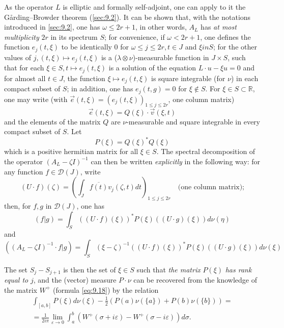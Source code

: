 \documentclass[12pt,a4paper,leqno,twoside]{extbook}
\newcommand{\R}{\mathbb{R}}
\begin{document}
As the operator \(L\) is elliptic and formally self-adjoint, one can apply to it the Gårding--Browder theorem (\ref{sec:9.2}). It can be shown that, with the notations introduced in \ref{sec:9.2}, one has \(\omega \leq 2r + 1\), in other words, \(A_L\) has \emph{at most multiplicity} \(2r\) in its spectrum \(S\); for convenience, if \(\omega < 2r + 1\), one defines the function \(e_j(t, \xi)\) to be identically 0 for \(\omega \leq j \leq 2r, t \in J\) and \(\xi in S\); for the other values of \(j, (t,\xi) \mapsto e_j(t,\xi)\) is a (\(\lambda \otimes \nu\))-measurable function in \(J \times S\), such that for each \(\xi \in S, t \mapsto e_j(t,\xi)\) is a solution of the equation \(L \cdot u - \xi u = 0\) and for almost all \(t \in J\), the function \(\xi \mapsto e_j(t, \xi)\) is square integrable (for \(\nu\)) in each compact subset of \(S\); in addition, one has \(e_j(t,g) = 0\) for \(\xi \not\in S\). For \(\xi \in S \subset \R\), one may write (with \(\vec{e}(t,\xi) = (e_j(t, \xi))_{1 \leq j \leq 2r}\), one column matrix)
\begin{equation}
    \label{eq:9.19}
    \vec{e}(t, \xi) = Q(\xi) \cdot \vec{v}(\xi, t)
\end{equation}
and the elements of the matrix \(Q\) are \(\nu\)-measurable and square integrable in every compact subset of \(S\). Let
\begin{equation}
    \label{eq:9.20}
    P(\xi) = Q(\xi)^* Q(\xi)
\end{equation}
which is a positive hermitian matrix for all \(\xi \in S\). The spectral decomposition of the operator \((A_L - \zeta I)^{-1}\) can then be written \emph{explicitly} in the following way: for any function \(f \in \mathcal{D}(J)\), write
\begin{equation}
    \label{eq:9.21}
    (U \cdot f)(\zeta) = \left( \int_J \overline{f(t)} v_j(\zeta, t) dt \right)_{1 \leq j \leq 2r} \quad \text{(one column matrix);}
\end{equation}
then, for \(f, g\) in \(\mathcal{D}(J)\), one has
\begin{equation}
    \label{eq:9.22}
    (f|g) = \int_S ((U \cdot f)(\xi))^* P(\xi)((U \cdot g)(\xi)) d\nu(\eta)
\end{equation}
and
\begin{equation}
    \label{eq:9.23}
    ((A_L - \zeta I)^{-1} \cdot f| g) = \int_S (\xi - \zeta)^{-1} ((U \cdot f)(\xi))^* P(\xi)((U \cdot g)(\xi)) d\nu(\xi)
\end{equation}

The set \(S_j - S_{j+1}\) is then the set of \(\xi \in S\) such that \emph{the matrix} \(P(\xi)\) \emph{has rank equal to} \(j\), and the (vector) measure \(P \cdot \nu\) can be recovered from the knowledge of the matrix \(W^+\) (formula \eqref{eq:9.18}) by the relation
\begin{equation}
    \label{eq:9.24}
    \begin{gathered}
        \int_{[a,b]} P(\xi)d\nu(\xi) - \frac{1}{2} (P(a)\nu(\{a\}) + P(b)\nu(\{b\})) = \\
        = \frac{1}{2i\pi} \lim_{\varepsilon \to 0} \int_a^b (W^+(\sigma + i\varepsilon) - W^+(\sigma - i\varepsilon)) d\sigma.
    \end{gathered}
\end{equation}
\end{document}
